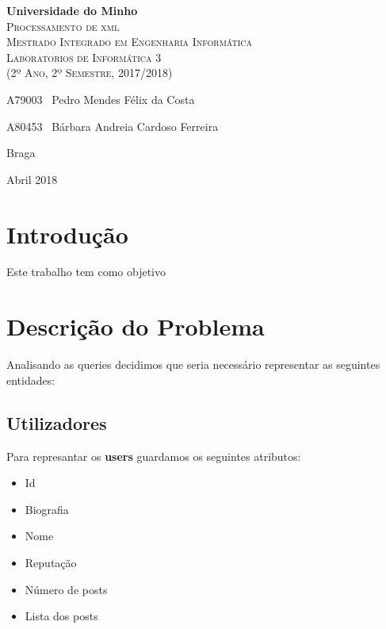 \documentclass[10pt,a4paper]{report}
\begin{document}
\begin{titlepage}
    \center
    \vspace*{4.0cm}
    {\huge {\bf Universidade do Minho}}\\[0.4cm]
    \vspace{3.0cm}
    \textsc{\huge{Processamento de xml}}\\[0.5cm] %
    \vspace{3.0cm}
    \textsc{\huge{Mestrado Integrado em Engenharia Informática}}\\[0.5cm]
    \vspace{2.0cm}
    \textsc{Laboratorios de Informática 3}\\[0.5cm]
    \textsc{(2º Ano, 2º Semestre, 2017/2018)}\\[0.5cm]
    \vspace{1.5cm}
    \begin{flushleft}
        A79003 \,\,\,Pedro Mendes Félix da Costa
        \vspace{0.2cm}

        A80453 \,\,\,Bárbara Andreia Cardoso Ferreira
    \end{flushleft}
        \vspace{1cm}
    \begin{flushright}
        Braga

        Abril 2018
    \end{flushright}

\end{titlepage}

\tableofcontents %

\chapter{Introdução}
    Este trabalho tem como objetivo 

\chapter{Descrição do Problema}
    Analisando as queries decidimos que seria necessário representar
    as seguintes entidades:

    \section{Utilizadores}
    Para represantar os \textbf{users} guardamos os seguintes atributos:
    \begin{itemize}
            \item Id
            \item Biografia
            \item Nome
            \item Reputação
            \item Número de posts
            \item Lista dos posts
    \end{itemize}
\end{document}
